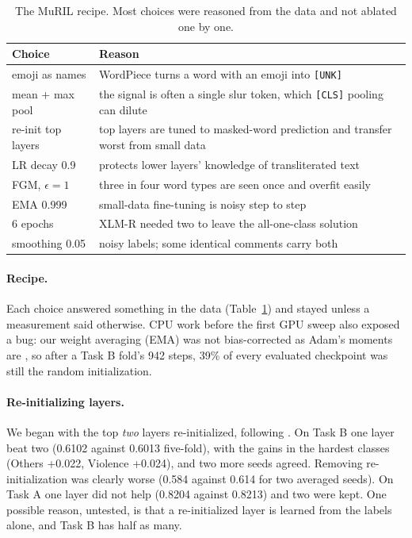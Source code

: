 \documentclass[11pt]{article}
\newcommand{\taska}{Task A}
\newcommand{\taskb}{Task B}
\begin{document}
\begin{table}[t]
\centering
\small
\begin{tabularx}{\linewidth}{@{}lX@{}}
\toprule
Choice & Reason \\
\midrule
emoji as names & WordPiece turns a word with an emoji into \texttt{[UNK]} \\
mean + max pool & the signal is often a single slur token, which \texttt{[CLS]} pooling can dilute \\
re-init top layers & top layers are tuned to masked-word prediction and transfer worst from small data \citep{zhang-etal-2021-revisiting} \\
LR decay 0.9 & protects lower layers' knowledge of transliterated text \citep{howard-ruder-2018-universal, sun-etal-2019-fine} \\
FGM, $\epsilon=1$ & three in four word types are seen once and overfit easily \citep{miyato-etal-2017-adversarial} \\
EMA 0.999 & small-data fine-tuning is noisy step to step \citep{polyak-juditsky-1992-acceleration} \\
6 epochs & XLM-R needed two to leave the all-one-class solution \\
smoothing 0.05 & noisy labels; some identical comments carry both \citep{szegedy-etal-2016-rethinking} \\
\bottomrule
\end{tabularx}
\caption{The MuRIL recipe. Most choices were reasoned from the data and
not ablated one by one.}
\label{tab:muril}
\end{table}

\paragraph{Recipe.} Each choice answered something in the data
(Table~\ref{tab:muril}) and stayed unless a measurement said otherwise. CPU work
before the first GPU sweep also exposed a bug: our weight averaging (EMA) was not
bias-corrected as Adam's moments are \citep{kingma-ba-2015-adam}, so after a \taskb{} fold's 942 steps, 39\% of every evaluated
checkpoint was still the random initialization.

\paragraph{Re-initializing layers.} We began with the top \emph{two} layers
re-initialized, following \citet{zhang-etal-2021-revisiting}. On \taskb{} one
layer beat two (0.6102 against 0.6013 five-fold), with the gains in the hardest
classes (Others +0.022, Violence +0.024), and two more seeds agreed. Removing
re-initialization was clearly worse (0.584 against 0.614 for two averaged
seeds). On \taska{} one layer did not help (0.8204 against 0.8213) and two were
kept. One possible reason, untested, is that a re-initialized layer is learned
from the labels alone, and \taskb{} has half as many.
\end{document}
